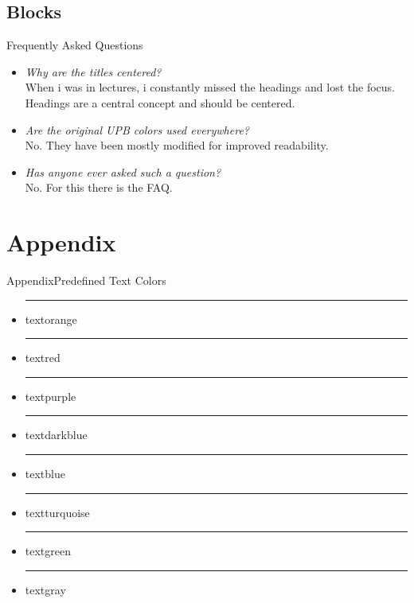 \documentclass{beamer}
\begin{document}
\subsection{Blocks}

\begin{frame}{Frequently Asked Questions}
\begin{itemize}
	\item \emph{Why are the titles centered?}\\
	When i was in lectures, i constantly missed the headings and lost the focus. Headings are a central concept and should be centered.
	\item \emph{Are the original UPB colors used everywhere?}\\
	No. They have been mostly modified for improved readability.
	\item \emph{Has anyone ever asked such a question?}\\
	No. For this there is the FAQ.
\end{itemize}
\end{frame}



\section{Appendix}
\appendix 

\begin{frame}{Appendix}{Predefined Text Colors}
	\begin{itemize}
		\item {\color{textorange}\rule{.7cm}{.4cm} textorange} 
		\item {\color{textred}\rule{.7cm}{.4cm} textred}
		\item {\color{textpurple}\rule{.7cm}{.4cm} textpurple} 
		\item {\color{textdarkblue}\rule{.7cm}{.4cm} textdarkblue}
		\item {\color{textblue}\rule{.7cm}{.4cm} textblue}
		\item {\color{textturquoise}\rule{.7cm}{.4cm} textturquoise}
		\item {\color{textgreen}\rule{.7cm}{.4cm} textgreen} 
		\item {\color{textgray}\rule{.7cm}{.4cm} textgray}
	\end{itemize}
\end{frame}
\end{document}
